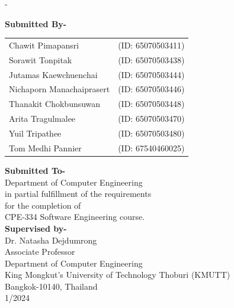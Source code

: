 \begin{titlingpage}
\begin{SingleSpace}
\begin{adjustwidth*}{\unitlength}{-\unitlength}
\begin{center}
				{\large \textbf{Submitted By-}}\\
				\begin{center}
					\begin{tabular}{@{} l l @{}}  %
						\large Chawit Pimapansri & \large (ID: 65070503411) \\
						\large Sorawit Tonpitak & \large (ID: 65070503438) \\
						\large Jutamas Kaewchuenchai & \large (ID: 65070503444) \\
						\large Nichaporn Manachaiprasert & \large (ID: 65070503446) \\
						\large Thanakit Chokbunsuwan & \large (ID: 65070503448) \\
						\large Arita Tragulmalee & \large (ID: 65070503470) \\
						\large Yuil Tripathee & \large (ID: 65070503480) \\
						\large Tom Medhi Pannier & \large (ID: 67540460025) \\
					\end{tabular}
				\end{center}
				\vspace{12mm}
				{\large \textbf{Submitted To-} }\\
				\vspace{3mm}
				{\large {Department of Computer Engineering}}\\
				{\large {in partial fulfillment of the requirements \\ for the completion of\\ CPE-334 Software Engineering course.}}\\
				\vspace{12mm}
				{\large \textbf{Supervised by-} }\\
				\vspace{3mm}
				{\large{Dr. Natasha Dejdumrong}}\\
				{\large {Associate Professor}}\\

				{\large {Department of Computer Engineering}}\\
				
				{\large King Mongkut's University of Technology Thoburi (KMUTT)}\\
				{\large Bangkok-10140, Thailand}\\
				{\large 1/2024}\\
			\end{center}
		\end{adjustwidth*}
	\end{SingleSpace}
\end{titlingpage}
